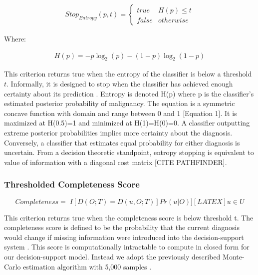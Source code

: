 \begin{align}
Stop_{Entropy}(p,t) =
\begin{cases} 
true & H(p)\leq t \\
false & otherwise
\end{cases}
\end{align}

Where:

\begin{align}
H(p) = -p\log_2(p) - (1-p)\log_2(1-p)
\end{align}

This criterion returns true when the entropy of the classifier is below a threshold $t$. Informally, it is designed to stop when the classifier has achieved enough certainty about its prediction \cite{MacKay:2003wc}. Entropy is denoted H(p) where p is the classifier's estimated posterior probability of malignancy. The equation is a symmetric concave function with domain and range between  0 and 1 [Equation 1]. It is maximized at H(0.5)=1 and minimized at H(1)=H(0)=0. A classifier outputting extreme posterior probabilities implies more certainty about the diagnosis. Conversely, a classifier that estimates equal probability for either diagnosis is uncertain. From a decision theoretic standpoint, entropy stopping is equivalent to value of information with a diagonal cost matrix [CITE PATHFINDER].

\subsubsection{Thresholded Completeness Score}
$$
Completeness = 􏰀 I[D(O;T) = D(u,O;T)]Pr(u|O)] [LATEX]u∈U 
$$

This criterion returns true when the completeness score is below threshold t. The completeness score is defined to be the probability that the current diagnosis would change if missing information were introduced into the decision-support system \cite{Gimenez:2014tr}. This score is computationally intractable to compute in closed form for our decision-support model. Instead we adopt the previously described Monte-Carlo estimation algorithm with 5,000 samples \cite{Gimenez:2014tr}. 

